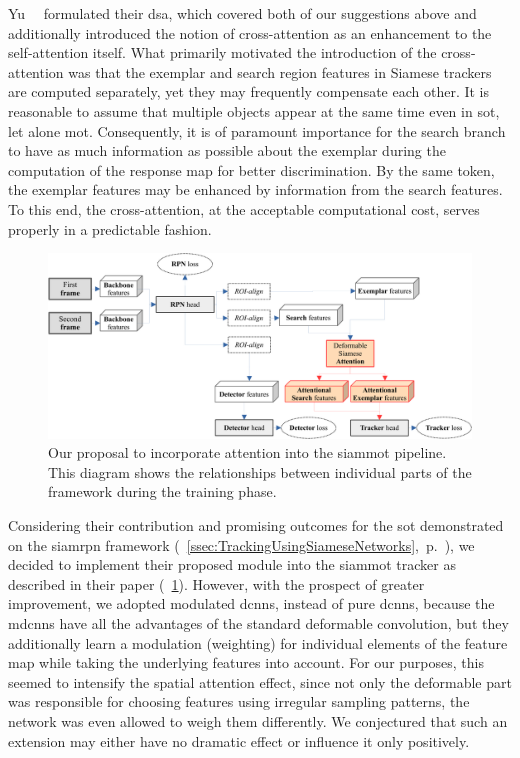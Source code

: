 Yu~\etal{}~\cite{yu2021dsa} formulated their \gls{dsa}, which covered both of our suggestions above and additionally introduced the notion of cross-attention as an enhancement to the self-attention itself. What primarily motivated the introduction of the cross-attention was that the exemplar and search region features in Siamese trackers are computed separately, yet they may frequently compensate each other. It is reasonable to assume that multiple objects appear at the same time even in \gls{sot}, let alone \gls{mot}. Consequently, it is of paramount importance for the search branch to have as much information as possible about the exemplar during the computation of the response map for better discrimination. By the same token, the exemplar features may be enhanced by information from the search features. To this end, the cross-attention, at the acceptable computational cost, serves properly in a predictable fashion.

\begin{figure}[t]
  \centerline{\includegraphics[width=\linewidth]{figures/siamese_tracking/siammot_attention_training.pdf}}
  \caption[\gls{siammot} with attention]{Our proposal to incorporate attention into the \gls{siammot} pipeline. This diagram shows the relationships between individual parts of the framework during the training phase.}
  \label{fig:SiamMOTWithAttention}
\end{figure}

Considering their contribution and promising outcomes for the \gls{sot} demonstrated on the \gls{siamrpn} framework (\sectiontext{}~\ref{ssec:TrackingUsingSiameseNetworks},~p.~\pageref{ssec:TrackingUsingSiameseNetworks}), we decided to implement their proposed module into the \gls{siammot} tracker as described in their paper (\figtext{}~\ref{fig:SiamMOTWithAttention}). However, with the prospect of greater improvement, we adopted modulated \glspl{dcnn}, instead of pure \glspl{dcnn}, because the \glspl{mdcnn} have all the advantages of the standard deformable convolution, but they additionally learn a modulation (weighting) for individual elements of the feature map while taking the underlying features into account. For our purposes, this seemed to intensify the spatial attention effect, since not only the deformable part was responsible for choosing features using irregular sampling patterns, the network was even allowed to weigh them differently. We conjectured that such an extension may either have no dramatic effect or influence it only positively.

